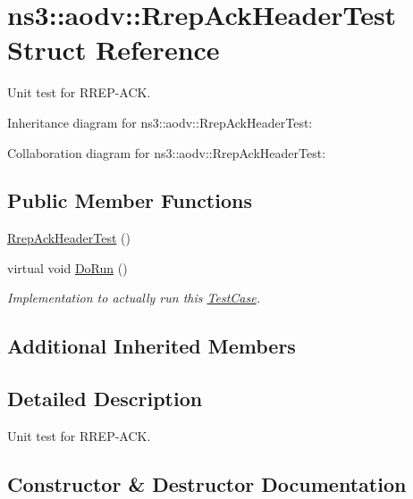 \hypertarget{structns3_1_1aodv_1_1RrepAckHeaderTest}{}\section{ns3\+:\+:aodv\+:\+:Rrep\+Ack\+Header\+Test Struct Reference}
\label{structns3_1_1aodv_1_1RrepAckHeaderTest}


Unit test for R\+R\+E\+P-\/\+A\+CK.  




Inheritance diagram for ns3\+:\+:aodv\+:\+:Rrep\+Ack\+Header\+Test\+:


Collaboration diagram for ns3\+:\+:aodv\+:\+:Rrep\+Ack\+Header\+Test\+:
\subsection*{Public Member Functions}
\begin{DoxyCompactItemize}
\item 
\hyperlink{structns3_1_1aodv_1_1RrepAckHeaderTest_adece7739067f3b92a2e28154acd496d4}{Rrep\+Ack\+Header\+Test} ()
\item 
virtual void \hyperlink{structns3_1_1aodv_1_1RrepAckHeaderTest_a7db635f942f193c505385afbb77cf6d8}{Do\+Run} ()
\begin{DoxyCompactList}\small\item\em Implementation to actually run this \hyperlink{classns3_1_1TestCase}{Test\+Case}. \end{DoxyCompactList}\end{DoxyCompactItemize}
\subsection*{Additional Inherited Members}


\subsection{Detailed Description}
Unit test for R\+R\+E\+P-\/\+A\+CK. 

\subsection{Constructor \& Destructor Documentation}
